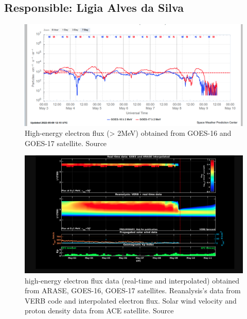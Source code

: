 \documentclass[a4paper, 10pt]{article}
\begin{document}
 \subsection{Responsible: Ligia Alves da Silva} 
 
\begin{figure}[H]
    
                        \centering
   
                             \includegraphics[width=14cm]{./figures//figureRadBelts_0.png}

                             \caption{ High-energy electron flux (> 2MeV) obtained from GOES-16 and GOES-17 satellite. Source}
                        \end{figure}

                     \begin{figure}[H]
    
                        \centering
   
                             \includegraphics[width=14cm]{./figures//figureRadBelts_1.png}

                             \caption{ high-energy electron flux data (real-time and interpolated) obtained from ARASE, GOES-16, GOES-17 satellites. Reanalysis’s data from VERB code and interpolated electron flux. Solar wind velocity and proton density data from ACE satellite. Source}
                        \end{figure}
\end{document}
